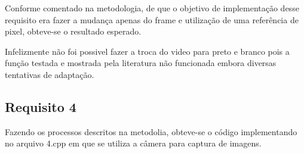 Conforme comentado na metodologia, de que o objetivo de implementação desse requisito era fazer a mudança apenas do frame e utilização de uma referência de pixel, obteve-se o resultado esperado.

Infelizmente não foi possivel fazer a troca do video para preto e branco pois a função testada e mostrada pela literatura\cite{cvtColor} não funcionada embora diversas tentativas de adaptação.

\subsection{Requisito 4}

Fazendo os processos descritos na metodolia, obteve-se o código implementando no arquivo 4.cpp em que se utiliza a câmera para captura de imagens.


